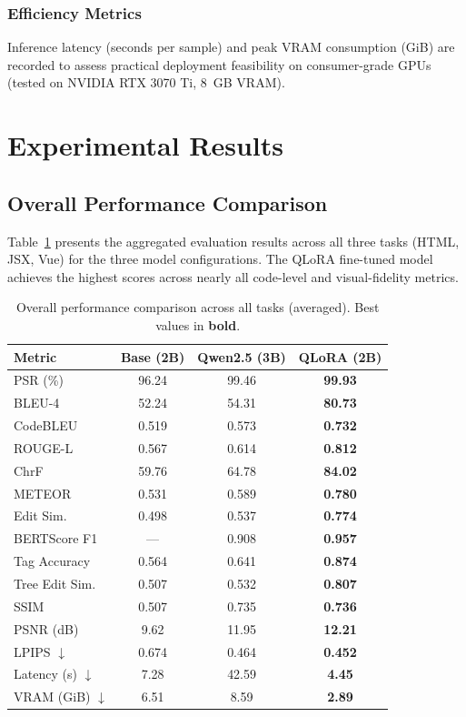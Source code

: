 \subsubsection{Efficiency Metrics}
Inference latency (seconds per sample) and peak VRAM consumption (GiB) are recorded to assess practical deployment feasibility on consumer-grade GPUs (tested on NVIDIA RTX 3070 Ti, 8~GB VRAM).


\section{Experimental Results}

\subsection{Overall Performance Comparison}

Table~\ref{tab:main_results} presents the aggregated evaluation results across all three tasks (HTML, JSX, Vue) for the three model configurations. The QLoRA fine-tuned model achieves the highest scores across nearly all code-level and visual-fidelity metrics.

\begin{table}[h]
\centering
\caption{Overall performance comparison across all tasks (averaged). Best values in \textbf{bold}.}
\label{tab:main_results}
\begin{tabular}{lccc}
\hline
\textbf{Metric} & \textbf{Base (2B)} & \textbf{Qwen2.5 (3B)} & \textbf{QLoRA (2B)} \\
\hline
PSR (\%) & 96.24 & 99.46 & \textbf{99.93} \\
BLEU-4 & 52.24 & 54.31 & \textbf{80.73} \\
CodeBLEU & 0.519 & 0.573 & \textbf{0.732} \\
ROUGE-L & 0.567 & 0.614 & \textbf{0.812} \\
ChrF & 59.76 & 64.78 & \textbf{84.02} \\
METEOR & 0.531 & 0.589 & \textbf{0.780} \\
Edit Sim. & 0.498 & 0.537 & \textbf{0.774} \\
BERTScore F1 & --- & 0.908 & \textbf{0.957} \\
Tag Accuracy & 0.564 & 0.641 & \textbf{0.874} \\
Tree Edit Sim. & 0.507 & 0.532 & \textbf{0.807} \\
\hline
SSIM & 0.507 & 0.735 & \textbf{0.736} \\
PSNR (dB) & 9.62 & 11.95 & \textbf{12.21} \\
LPIPS $\downarrow$ & 0.674 & 0.464 & \textbf{0.452} \\
\hline
Latency (s) $\downarrow$ & 7.28 & 42.59 & \textbf{4.45} \\
VRAM (GiB) $\downarrow$ & 6.51 & 8.59 & \textbf{2.89} \\
\hline
\end{tabular}
\end{table}

